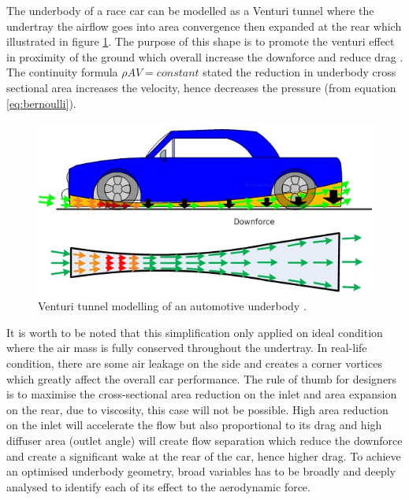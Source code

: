 \noindent The underbody of a race car can be modelled as a Venturi tunnel where the undertray the airflow goes into area convergence then expanded at the rear which illustrated in figure \ref{fig:venturi_tunnel_car}. The purpose of this shape is to promote the venturi effect in proximity of the ground which overall increase the downforce and reduce drag \cite{Katz2005AerodynamicsCars}. The continuity formula $\rho AV = constant$ stated the reduction in underbody cross sectional area increases the velocity, hence decreases the pressure (from equation \ref{eq:bernoulli}).

\begin{figure}[!ht]
    \centering
    \includegraphics[scale=0.8]{Figures/venturi_tunnel.jpg}
    \caption{Venturi tunnel modelling of an automotive underbody \cite{Anonymous2020RaceDesign}.}
    \label{fig:venturi_tunnel_car}
\end{figure}

\noindent It is worth to be noted that this simplification only applied on ideal condition where the air mass is fully conserved throughout the undertray. In real-life condition, there are some air leakage on the side and creates a corner vortices which greatly affect the overall car performance. The rule of thumb for designers is to maximise the cross-sectional area reduction on the inlet and area expansion on the rear, due to viscosity, this case will not be possible. High area reduction on the inlet will accelerate the flow but also proportional to its drag and high diffuser area (outlet angle) will create flow separation which reduce the downforce and create a significant wake at the rear of the car, hence higher drag. To achieve an optimised underbody geometry, broad variables has to be broadly and deeply analysed to identify each of its effect to the aerodynamic force.


